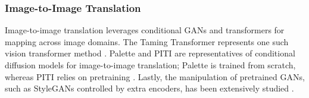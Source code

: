 \subsubsection{Image-to-Image Translation}
Image-to-image translation leverages conditional GANs \cite{isola2018imagetoimagetranslationconditionaladversarial, wang2018highresolutionimagesynthesissemantic, zhou2021cocosnetv2fullresolutioncorrespondence, zhu2018multimodalimagetoimagetranslation} 
and transformers \cite{chen2021pretrainedimageprocessingtransformer,ramesh2021zeroshottexttoimagegeneration} 
for mapping across image domains. The Taming Transformer represents one such vision 
transformer method \cite{esser2021tamingtransformershighresolutionimage}. Palette and PITI are 
representatives of conditional diffusion models for image-to-image translation; Palette is 
trained from scratch, whereas PITI relies on pretraining \cite{saharia2022paletteimagetoimagediffusionmodels, wang2022pretrainingneedimagetoimagetranslation}. 
Lastly, the manipulation of pretrained GANs, such as StyleGANs controlled by extra encoders, has been 
extensively studied \cite{richardson2021encodingstylestyleganencoder}.